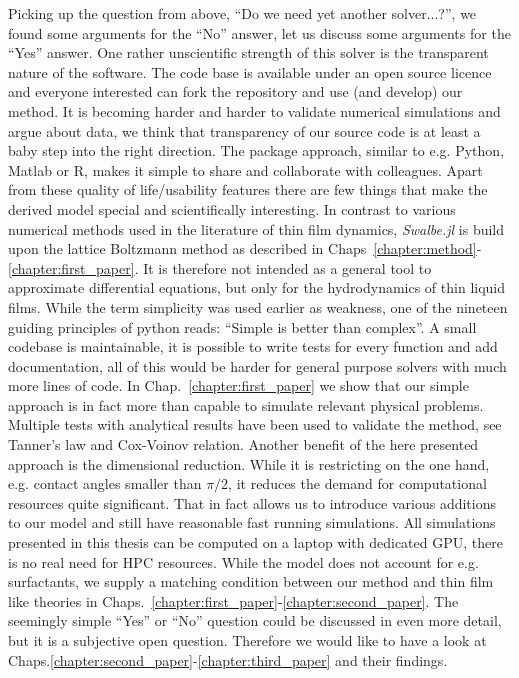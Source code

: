 Picking up the question from above, ``Do we need yet another solver...?'', we found some arguments for the ``No'' answer, let us discuss some arguments for the ``Yes'' answer.
One rather unscientific strength of this solver is the transparent nature of the software. 
The code base is available under an open source licence and everyone interested can fork the repository and use (and develop) our method.
It is becoming harder and harder to validate numerical simulations and argue about data, we think that transparency of our source code is at least a baby step into the right direction. 
The package approach, similar to e.g. Python, Matlab or R, makes it simple to share and collaborate with colleagues.
Apart from these quality of life/usability features there are few things that make the derived model special and scientifically interesting.
In contrast to various numerical methods used in the literature of thin film dynamics, \textit{Swalbe.jl} is build upon the lattice Boltzmann method as described in Chaps~\ref{chapter:method}-\ref{chapter:first_paper}.
It is therefore not intended as a general tool to approximate differential equations, but only for the hydrodynamics of thin liquid films.
While the term simplicity was used earlier as weakness, one of the nineteen guiding principles of python reads: ``Simple is better than complex''.
A small codebase is maintainable, it is possible to write tests for every function and add documentation, all of this would be harder for general purpose solvers with much more lines of code.
In Chap.~\ref{chapter:first_paper} we show that our simple approach is in fact more than capable to simulate relevant physical problems.
Multiple tests with analytical results have been used to validate the method, see Tanner's law and Cox-Voinov relation.
Another benefit of the here presented approach is the dimensional reduction.
While it is restricting on the one hand, e.g. contact angles smaller than $\pi/2$, it reduces the demand for computational resources quite significant.
That in fact allows us to introduce various additions to our model and still have reasonable fast running simulations.
All simulations presented in this thesis can be computed on a laptop with dedicated GPU, there is no real need for HPC resources.
While the model does not account for e.g. surfactants, we supply a matching condition between our method and thin film like theories in Chaps.~\ref{chapter:first_paper}-\ref{chapter:second_paper}.
The seemingly simple ``Yes'' or ``No'' question could be discussed in even more detail, but it is a subjective open question.
Therefore we would like to have a look at Chaps.\ref{chapter:second_paper}-\ref{chapter:third_paper} and their findings.
 
